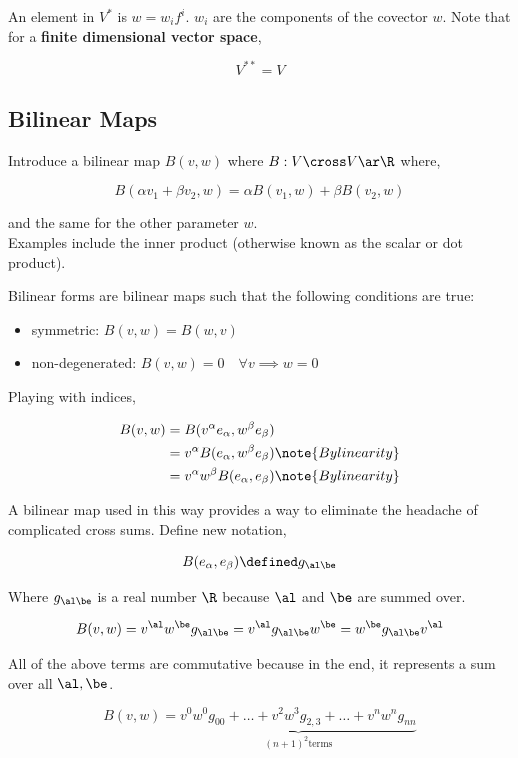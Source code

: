 \documentclass{article}
\begin{document}
An element in $V^*$ is $w = w_if^i$. $w_i$ are the components of the covector $w$. Note that for a \textbf{finite dimensional vector space},

\[ V^{**} = V \]

\subsection{Bilinear Maps}

Introduce a bilinear map $B(v, w)$ where $B: V \cross V \ar \R$ where,

\[ B(\alpha v_1 + \beta v_2, w) = \alpha B(v_1, w) + \beta B(v_2, w) \]

and the same for the other parameter $w$. \\

Examples include the inner product (otherwise known as the scalar or dot product).

Bilinear forms are bilinear maps such that the following conditions are true:

\begin{itemize}
    \item symmetric: $B(v,w) = B(w,v)$
    \item non-degenerated: $B(v,w) = 0 \quad \forall v \implies w = 0$
\end{itemize}

Playing with indices,

\begin{align*}
    B(v,w) &= B(v^\alpha e_\alpha, w^\beta e_\beta) \\
           &= v^\alpha B( e_\alpha, w^\beta e_\beta) \note{By linearity} \\
           &= v^\alpha w^\beta B( e_\alpha, e_\beta) \note{By linearity}
\end{align*}

A bilinear map used in this way provides a way to eliminate the headache of complicated cross sums. Define new notation,

\[ B( e_\alpha, e_\beta) \defined g_{\al\be} \]

Where $g_{\al\be}$ is a real number $\R$ because $\al$ and $\be$ are summed over.

\[ B(v, w) = v^\al w^\be g_{\al\be} = v^\al g_{\al\be}w^\be =  w^\be g_{\al\be} v^\al \]

All of the above terms are commutative because in the end, it represents a sum over all $\al, \be$.

\[ B(v,w) = \underbrace{v^0w^0g_{00} + \ldots + v^2w^3g_{2,3} + \ldots + v^nw^ng_{nn}}_{(n+1)^2 \text{terms}} \]
\end{document}
